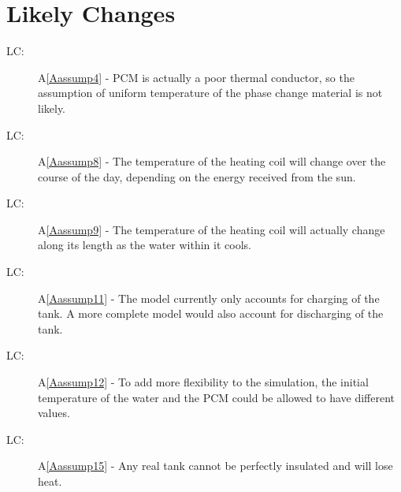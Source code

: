 \documentclass[12pt]{article}
\newcounter{lcnum}
\newcommand{\lcthelcnum}{LC\thelcnum}
\begin{document}
\section{Likely Changes}
\label{Sec:LikeChan}
\begin{description}
\item[\lcthelcnum\label{LClikeChg1}:]A\ref{Aassump4} - PCM is actually a poor thermal conductor, so the assumption of uniform temperature of the phase change material is not likely.
\end{description}
\begin{description}
\item[\lcthelcnum\label{LClikeChg2}:]A\ref{Aassump8} - The temperature of the heating coil will change over the course of the day, depending on the energy received from the sun.
\end{description}
\begin{description}
\item[\lcthelcnum\label{LClikeChg3}:]A\ref{Aassump9} - The temperature of the heating coil will actually change along its length as the water within it cools.
\end{description}
\begin{description}
\item[\lcthelcnum\label{LClikeChg4}:]A\ref{Aassump11} - The model currently only accounts for charging of the tank. A more complete model would also account for discharging of the tank.
\end{description}
\begin{description}
\item[\lcthelcnum\label{LClikeChg5}:]A\ref{Aassump12} - To add more flexibility to the simulation, the initial temperature of the water and the PCM could be allowed to have different values.
\end{description}
\begin{description}
\item[\lcthelcnum\label{LClikeChg6}:]A\ref{Aassump15} - Any real tank cannot be perfectly insulated and will lose heat.
\end{description}
\end{document}
